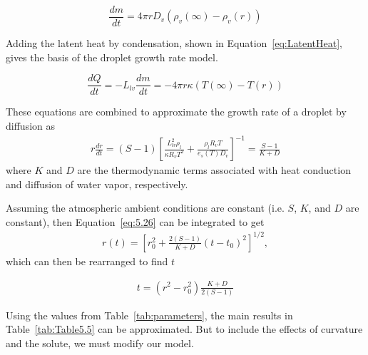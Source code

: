 \documentclass[]{article}
\begin{document}
\begin{equation}
    \label{eq:Diffusion}
    \dfrac{dm}{dt}=4 \pi r D_{v} \left( \rho_{v}(\infty) - \rho_{v}(r) \right)
\end{equation}

Adding the latent heat by condensation, shown in
Equation~\eqref{eq:LatentHeat}, gives the basis of the droplet growth rate
model.

\begin{equation}
    \label{eq:LatentHeat}
    \dfrac{dQ}{dt}=-L_{lv}\dfrac{dm}{dt}=-4 \pi r \kappa \left( T(\infty) - T(r) \right)
\end{equation}

These equations are combined to approximate the growth rate of a droplet by
diffusion as
\begin{align}
    \label{eq:5.26}
    r \frac{dr}{dt} = (S - 1) \left[ \frac{L_{lv}^2 \rho_l}{\kappa R_v T^2} + \frac{\rho_l R_v T}{e_s(T) D_v} \right] ^{-1} = \frac{S - 1}{K + D}
\end{align}
where $K$ and $D$ are the thermodynamic terms associated with heat conduction
and diffusion of water vapor, respectively.

Assuming the atmospheric ambient conditions are constant (i.e. $S$, $K$, and
$D$ are constant), then Equation~\ref{eq:5.26} can be integrated to get
\begin{align}
    \label{eq:5.27}
    r(t) = \left[ r_0^2 + \frac{2(S -1)}{K + D}(t - t_0)^2 \right] ^{1/2},
\end{align}
which can then be rearranged to find $t$

\begin{align}
    \label{eq:5.27T}
    t = (r^2 - r_0^2) \frac{K + D}{2(S - 1)}
\end{align}

Using the values from Table~\ref{tab:parameters}, the main results in
Table~\ref{tab:Table5.5} can be approximated. But to include the effects of
curvature and the solute, we must modify our model.
\end{document}
